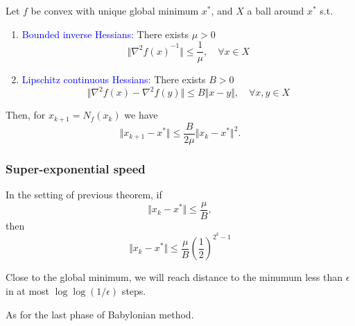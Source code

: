 \documentclass[aspectratio=149]{beamer}
\begin{document}
\begin{frame}
  \begin{theorem}
    Let $f$ be convex with unique global minimum $x^*$, and $X$ a ball around $x^*$ s.t.
    \begin{enumerate}
      \item \textcolor{blue}{Bounded inverse Hessians:} There exists $\mu > 0$
            \begin{equation}
              \Vert {\nabla^2 f(x)}^{-1} \Vert \le \frac{1}{\mu}, \quad \forall x \in X
            \end{equation}
      \item \textcolor{blue}{Lipschitz continuous Hessians:} There exists $B>0$
            \begin{equation}
              \Vert \nabla^2 f(x) - \nabla^2 f(y) \Vert \le B \Vert x-y \Vert, \quad \forall x,y \in X
            \end{equation}
    \end{enumerate}
    Then, for $x_{k+1} = N_f(x_k)$ we have
    \begin{equation}
      \Vert x_{k+1} -x^* \Vert \le \frac{B}{2 \mu} \Vert x_k - x^* \Vert^2.
    \end{equation}
  \end{theorem}
\end{frame}


\begin{frame}
  \frametitle{Super-exponential speed}
  \begin{corollary}%
    In the setting of previous theorem, if
    \begin{equation}
      \Vert x_k - x^* \Vert \le \frac{\mu}{B},
    \end{equation}
    then
    \begin{equation}
      \Vert x_k -x^*  \Vert \le \frac{\mu}{B} {\left( \frac{1}{2} \right)}^{2^k-1}
    \end{equation}
  \end{corollary}
  Close to the global minimum, we will reach distance to the minumum less than $\epsilon$ in at most $\log \log (1/\epsilon)$ steps.

  As for the last phase of Babylonian method.
\end{frame}
\end{document}
